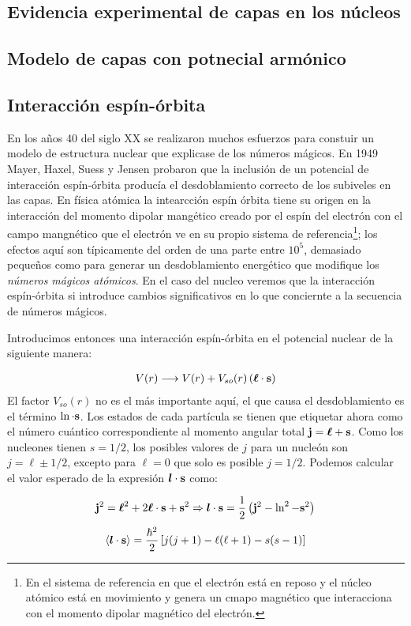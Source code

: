 \subsection{Evidencia experimental de capas en los núcleos}

\subsection{Modelo de capas con potnecial armónico}

\subsection{Interacción espín-órbita}

En los años 40 del siglo XX se realizaron muchos esfuerzos para constuir un modelo de estructura nuclear que explicase de los números mágicos. En 1949 Mayer, Haxel, Suess y Jensen probaron que la inclusión de un potencial de interacción espín-órbita producía el desdoblamiento correcto de los subiveles en las capas. En física atómica la intearcción espín órbita tiene su origen en la interacción del momento dipolar mangético creado por el espín del electrón con el campo mangnético que el electrón ve en su propio sistema de referencia\footnote{En el sistema de referencia en que el electrón está en reposo y el núcleo atómico está en movimiento y genera un cmapo magnético que interacciona con el momento dipolar magnético del electrón.}; los efectos aquí son típicamente del orden de una parte entre $10^5$, demasiado pequeños como para generar un desdoblamiento energético que modifique los \textit{números mágicos atómicos}. En el caso del nucleo veremos que la interacción espín-órbita si introduce cambios significativos en lo que conciernte a la secuencia de números mágicos. 

Introducimos entonces una interacción espín-órbita en el potencial nuclear de la siguiente manera:

\begin{eqnarray}
    V(r) \longrightarrow V(r) + V_{so} (r) \left( \boldsymbol{\ell} \cdot \mathbf{s} \right)
\end{eqnarray}
El factor $V_{so} (r)$ no es el más importante aquí, el que causa el desdoblamiento es el término $\ln\cdot\mathbf{s}$. Los estados de cada partícula se tienen que etiquetar ahora como el número cuántico correspondiente al momento angular total $\mathbf{j} =\boldsymbol{\ell}+\mathbf{s}$. Como los nucleones tienen $s=1/2$, los posibles valores de $j$ para un nucleón son $j=\ell\pm 1/2$, excepto para $\ell=0$ que solo es posible $j=1/2$. Podemos calcular el valor esperado de la expresión $\boldsymbol{l} \cdot \mathbf{s}$ como:

\begin{eqnarray}
    \mathbf{j}^2 = \boldsymbol{\ell}^2 + 2 \boldsymbol{\ell}\cdot\mathbf{s} + \mathbf{s}^2 \Rightarrow \boldsymbol{l} \cdot \mathbf{s} = \frac{1}{2} \left( \mathbf{j}^2 -\ln^2 -\mathbf{s}^2 \right)     
\end{eqnarray}
\begin{eqnarray}
    \langle \boldsymbol{l} \cdot \mathbf{s} \rangle = \frac{\hbar^2}{2} \left[ j(j+1)-\ell(\ell+1) - s(s-1) \right]
\end{eqnarray}
